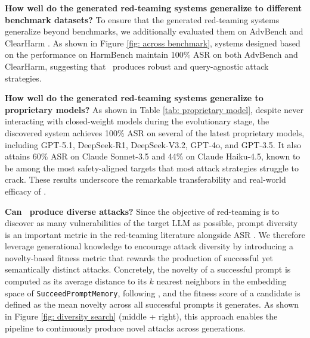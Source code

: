 \textbf{How well do the generated red-teaming systems generalize to different benchmark datasets?} To ensure that the generated red-teaming systems generalize beyond benchmarks, we additionally evaluated them on AdvBench \citep{chen2022should} and ClearHarm \citep{hollinsworth2025clearharm}. As shown in Figure \ref{fig: across benchmark}, systems designed based on the performance on HarmBench maintain 100\% ASR on both AdvBench and ClearHarm, suggesting that \method~produces robust and query-agnostic attack strategies.

\textbf{How well do the generated red-teaming systems generalize to proprietary models?} As shown in Table \ref{tab: proprietary model}, despite never interacting with closed-weight models during the evolutionary stage, the discovered system achieves 100\% ASR on several of the latest proprietary models, including GPT-5.1, DeepSeek-R1, DeepSeek-V3.2, GPT-4o, and GPT-3.5. It also attains 60\% ASR on Claude Sonnet-3.5 and 44\% on Claude Haiku-4.5, known to be among the most safety-aligned targets that most attack strategies struggle to crack. These results underscore the remarkable transferability and real-world efficacy of \method.

\textbf{Can \method~produce diverse attacks?}
\label{expr: diversity search} Since the objective of red-teaming is to discover as many vulnerabilities of the target LLM as possible, prompt diversity is an important metric in the red-teaming literature alongside ASR \citep{wang2025qualitydiversityredteamingautomatedgeneration}. We therefore leverage generational knowledge to encourage attack diversity by introducing a novelty-based fitness metric that rewards the production of successful yet semantically distinct attacks. Concretely, the novelty of a successful prompt is computed as its average distance to its $k$ nearest neighbors in the embedding space of \texttt{SucceedPromptMemory}, following \citep{rahman2025xteamingmultiturnjailbreaksdefenses}, and the fitness score of a candidate is defined as the mean novelty across all successful prompts it generates. As shown in Figure \ref{fig: diversity search} (middle + right), this approach enables the pipeline to continuously produce novel attacks across generations.